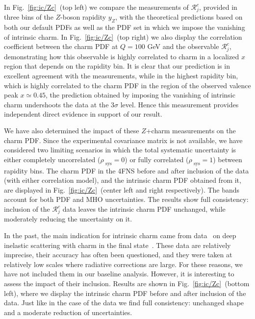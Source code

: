 In Fig.~\ref{fig:ic/Zc}~(top left) we compare the \lhcb measurements of $\mathcal{R}_j^c$, provided
in three bins of the $Z$-boson rapidity
$y_Z$, with the theoretical predictions
 based on both our default PDFs as well as the PDF set in
 which we impose the vanishing of intrinsic charm.
 In Fig.~\ref{fig:ic/Zc}~(top right)
we also display the  correlation coefficient between
 the  charm PDF at $Q=100$ GeV 
 and the observable  $\mathcal{R}_j^c$, demonstrating how this observable
 is highly
 correlated to charm in a localized
 $x$ region that depends on the rapidity bin.
 It is clear that
 our prediction is in excellent agreement with the \lhcb measurements, while in the
 highest rapidity bin, which is highly correlated to the charm PDF in
 the region of the observed valence peak $x\simeq 0.45$, the prediction
 obtained by imposing the vanishing of intrinsic charm undershoots the
 data at the $3\sigma$ level.
%
 Hence this measurement provides
 independent direct evidence in support of our result.

 We have also determined the impact of these \lhcb $Z$+charm measurements on the
charm PDF.
%
Since the experimental covariance matrix is not available,
we have considered two limiting scenarios in which the total
systematic uncertainty is either completely uncorrelated 
($\rho_\textrm{ sys}=0$) or fully correlated  ($\rho_\textrm{ sys}=1$) between
 rapidity bins. The charm PDF in the 4FNS before and after
inclusion of the \lhcb data (with either correlation model), and the intrinsic
charm PDF obtained from it, are displayed in
Fig.~\ref{fig:ic/Zc}~(center left and right respectively).
%
The bands account for both PDF and MHO uncertainties.
%
The results show full consistency: inclusion of the \lhcb  $\mathcal{R}_j^c$ data leaves
the intrinsic charm PDF unchanged, while moderately reducing the
uncertainty on it.

In the past, the main indication for  intrinsic charm came from \emc data~\cite{Aubert:1982tt} on deep inelastic scattering with charm in the final state~\cite{Harris:1995jx}.
%
These data are relatively imprecise, their accuracy has often been questioned,
and they were taken at relatively low scales where radiative corrections are large.
%
For these reasons, we have not included them in our baseline
analysis.
%
However, it is interesting to assess the impact of
their inclusion.
%
Results are shown in 
Fig.~\ref{fig:ic/Zc}~(bottom left), where we display the
intrinsic charm PDF before and after inclusion of the \emc data.
%
Just
like in the case of the \lhcb data we find full consistency: unchanged
shape and a moderate reduction of uncertainties.

